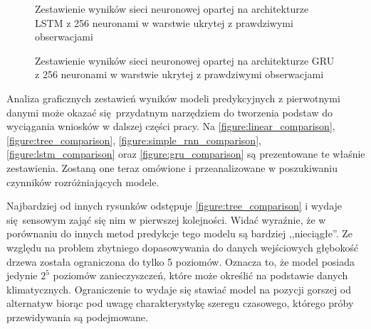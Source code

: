 \documentclass[10pt,a4paper]{article}
\begin{document}
\FloatBarrier
\begin{figure}[!ht]
	\centering
	\caption{Zestawienie wyników sieci neuronowej opartej na architekturze LSTM z 256 neuronami w warstwie ukrytej z prawdziwymi obserwacjami}
	\label{figure:lstm_comparison}
\end{figure}
\FloatBarrier
\begin{figure}[!ht]
	\centering
	\caption{Zestawienie wyników sieci neuronowej opartej na architekturze GRU z 256 neuronami w warstwie ukrytej z prawdziwymi obserwacjami}
	\label{figure:gru_comparison}
\end{figure}
\FloatBarrier

Analiza graficznych zestawień wyników modeli predykcyjnych z pierwotnymi danymi może okazać się przydatnym narzędziem do tworzenia podstaw do wyciągania wniosków w dalszej części pracy. Na \autoref{figure:linear_comparison}, \autoref{figure:tree_comparison}, \autoref{figure:simple_rnn_comparison}, \autoref{figure:lstm_comparison} oraz \autoref{figure:gru_comparison} są prezentowane te właśnie zestawienia. Zostaną one teraz omówione i przeanalizowane w poszukiwaniu czynników rozróżniających modele.

Najbardziej od innych rysunków odstępuje \autoref{figure:tree_comparison} i wydaje się sensowym zająć się nim w pierwszej kolejności. Widać wyraźnie, że w porównaniu do innych metod predykcje tego modelu są bardziej ,,nieciągłe''. Ze względu na problem zbytniego dopasowywania do danych wejściowych głębokość drzewa została ograniczona do tylko 5 poziomów. Oznacza to, że model posiada jedynie $2^5$ poziomów zanieczyszczeń, które może określić na podstawie danych klimatycznych. Ograniczenie to wydaje się stawiać model na pozycji gorszej od alternatyw biorąc pod uwagę charakterystykę szeregu czasowego, którego próby przewidywania są podejmowane. 
\end{document}
